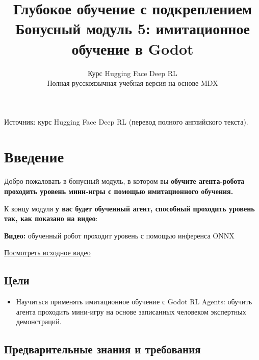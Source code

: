 \documentclass[11pt,a4paper]{article}
\title{\textbf{Глубокое обучение с подкреплением}\\[0.35em]\large Бонусный модуль 5: имитационное обучение в Godot}
\author{Курс Hugging Face Deep RL\\\small Полная русскоязычная учебная версия на основе MDX}
\date{}
\begin{document}
\selectfont
\maketitle
\vspace{-0.65em}
\begin{center}\small\color{secondary}Источник: курс Hugging Face Deep RL (перевод полного английского текста).\end{center}
\begingroup\small\setlength{\parskip}{0pt}\tableofcontents\endgroup
\vspace{0.4em}

\section{Введение}\label{introduction}


Добро пожаловать в бонусный модуль, в котором вы \textbf{обучите агента-робота проходить уровень мини-игры с помощью имитационного обучения.}

К концу модуля \textbf{у вас будет обученный агент, способный проходить уровень так, как показано на видео}:

\begin{coursenote}\textbf{Видео:} обученный робот проходит уровень с помощью инференса ONNX\par\small\href{https://huggingface.co/datasets/huggingface-deep-rl-course/course-images/resolve/main/en/unit13/onnx_inference_test.mp4}{Посмотреть исходное видео}\end{coursenote}

\subsection{Цели}\label{objectives}

\begin{itemize}
\tightlist
\item
  Научиться применять имитационное обучение с Godot RL Agents: обучить агента проходить мини-игру на основе записанных человеком экспертных демонстраций.
\end{itemize}

\subsection{Предварительные знания и требования}\label{prerequisites-and-requirements}
\end{document}
